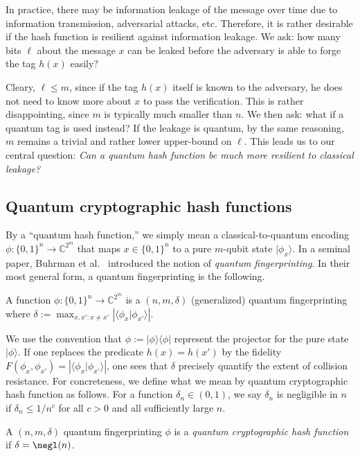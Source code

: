In practice, there may be information leakage of the message over time due to information transmission, adversarial attacks, etc. Therefore, it is rather desirable if the hash function is resilient against information leakage. We ask: how many bits $\ell$ about the message $x$ can be leaked before the adversary is able to forge the tag $h(x)$ easily? 

Cleary, $\ell \le m$, since if the tag $h(x)$ itself is known to the adversary, he does not need to know more about $x$ to pass the verification. This is rather disappointing, since $m$ is typically much smaller than $n$. 
We then ask: what if a quantum tag is used instead? If the leakage is quantum, by the same reasoning, $m$ remains a trivial and rather lower upper-bound on $\ell$. This leads us to our central question: 
{\em Can a quantum hash function be much more resilient to {\em classical} leakage?}

\subsection{Quantum cryptographic hash functions}
By a ``quantum hash function,'' we simply mean a classical-to-quantum encoding $\phi: \{0, 1\}^n\to {\mathbb{C}}^{2^m}$ that maps $x\in\{0, 1\}^n$ to a pure $m$-qubit state $|\phi_x\rangle$. In a seminal paper, Buhrman et al.~\cite{buhrman2001quantum} introduced the notion of {\em quantum fingerprinting}. In their most general form, a quantum fingerprinting is the following.
\begin{definition}\label{def:qfinger}
A function $\phi:\{0, 1\}^n\to{\mathbb{C}^{2^m}}$ is a $(n, m, \delta)$ (generalized) quantum fingerprinting where
 $\delta:=\max_{x,x': x\ne x'} \left|\langle\phi_x | \phi_{x'}\rangle\right|$.
\end{definition}

We use the convention that $\phi:=|\phi\rangle\langle\phi|$ represent the projector for the pure state $|\phi\rangle$.
If one replaces the predicate $h(x)=h(x')$ by the fidelity $F(\phi_x, \phi_{x'}) = \left|\langle\phi_x|\phi_{x'}\rangle\right|$, one sees that $\delta$ precisely quantify the extent of collision resistance. For concreteness, we define what we mean by quantum cryptographic hash function as follows. For a function $\delta_n\in(0, 1)$, we say $\delta_n$
is negligible in $n$ if $\delta_n\le 1/n^c$ for all $c>0$ and all sufficiently large $n$.

\begin{definition}\label{def:qhash}
A $(n, m, \delta)$ quantum fingerprinting $\phi$ is a {\em quantum cryptographic hash function}  if $\delta=\negl(n)$. 
\end{definition}

